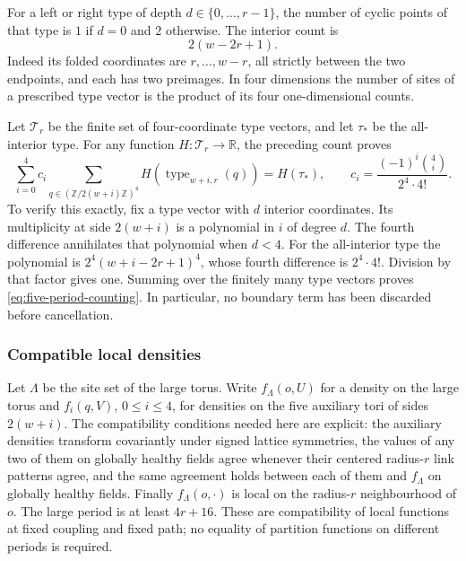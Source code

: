 For a left or right type of depth $d\in\{0,\ldots,r-1\}$,
the number of cyclic points of that type is $1$ if $d=0$ and
$2$ otherwise. The interior count is
\[
                              2(w-2r+1).
\]
Indeed its folded coordinates are $r,\ldots,w-r$, all strictly
between the two endpoints, and each has two preimages. In four
dimensions the number of sites of a prescribed type vector is the
product of its four one-dimensional counts.

Let $\mathcal T_r$ be the finite set of four-coordinate type vectors,
and let $\tau_*$ be the all-interior type. For any function
$H:\mathcal T_r\to\mathbb R$, the preceding count proves
\begin{equation}\label{eq:five-period-counting}
 \sum_{i=0}^4 c_i\sum_{q\in(\mathbb Z/2(w+i)\mathbb Z)^4}
                      H(\operatorname{type}_{w+i,r}(q))=H(\tau_*),
 \qquad c_i=\frac{(-1)^i\binom4i}{2^4\cdot4!}.
\end{equation}
To verify this exactly, fix a type vector with $d$ interior
coordinates. Its multiplicity at side $2(w+i)$ is a polynomial
in $i$ of degree $d$. The fourth difference annihilates that
polynomial when $d<4$. For the all-interior type the polynomial
is $2^4(w+i-2r+1)^4$, whose fourth difference is $2^4\cdot4!$.
Division by that factor gives one. Summing over the finitely many
type vectors proves \eqref{eq:five-period-counting}. In particular,
no boundary term has been discarded before cancellation.

\subsubsection{Compatible local densities}
Let $\Lambda$ be the site set of the large torus. Write
$f_\Lambda(o,U)$ for a density on the large torus and
$f_i(q,V)$, $0\le i\le4$, for densities on the five auxiliary tori
of sides $2(w+i)$. The compatibility conditions needed here are
explicit: the auxiliary densities transform covariantly under signed
lattice symmetries, the values of any two of them on globally
healthy fields agree whenever their centered radius-$r$ link
patterns agree, and the same agreement holds between each of them
and $f_\Lambda$ on globally healthy fields. Finally
$f_\Lambda(o,\cdot)$ is local on the radius-$r$ neighbourhood of
$o$.
The large period is at least $4r+16$. These are compatibility of
local functions at fixed coupling and fixed path; no equality of
partition functions on different periods is required.

